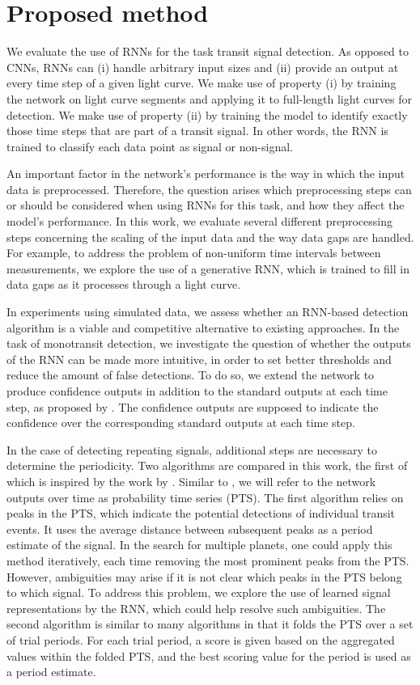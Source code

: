 
\section{Proposed method}
\label{sec:proposed}

We evaluate the use of RNNs for the task transit signal detection. As opposed to CNNs, RNNs can (i) handle arbitrary input sizes and (ii) provide an output at every time step of a given light curve. We make use of property (i) by training the network on light curve segments and applying it to full-length light curves for detection. We make use of property (ii) by training the model to identify exactly those time steps that are part of a transit signal. In other words, the RNN is trained to classify each data point as signal or non-signal.

An important factor in the network's performance is the way in which the input data is preprocessed. Therefore, the question arises which preprocessing steps can or should be considered when using RNNs for this task, and how they affect the model’s performance. In this work, we evaluate several different preprocessing steps concerning the scaling of the input data and the way data gaps are handled. For example, to address the problem of non-uniform time intervals between measurements, we explore the use of a generative RNN, which is trained to fill in data gaps as it processes through a light curve. 

In experiments using simulated data, we assess whether an RNN-based detection algorithm is a viable and competitive alternative to existing approaches. In the task of monotransit detection, we investigate the question of whether the outputs of the RNN can be made more intuitive, in order to set better thresholds and reduce the amount of false detections. 
To do so, we extend the network to produce confidence outputs in addition to the standard outputs at each time step, as proposed by \cite{devries2018learning}. 
The confidence outputs are supposed to indicate the confidence over the corresponding standard outputs at each time step.

In the case of detecting repeating signals, additional steps are necessary to determine the periodicity. Two algorithms are compared in this work, the first of which is inspired by the work by \cite{pearson2018searching}. Similar to \cite{pearson2018searching}, we will refer to the network outputs over time as probability time series (PTS). The first algorithm relies on peaks in the PTS, which indicate the potential detections of individual transit events. It uses the average distance between subsequent peaks as a period estimate of the signal. In the search for multiple planets, one could apply this method iteratively, each time removing the most prominent peaks from the PTS. However, ambiguities may arise if it is not clear which peaks in the PTS belong to which signal. To address this problem, we explore the use of learned signal representations by the RNN, which could help resolve such ambiguities.  
The second algorithm is similar to many algorithms in that it folds the PTS over a set of trial periods. 
For each trial period, a score is given based on the aggregated values within the folded PTS, and the best scoring value for the period is used as a period estimate.

